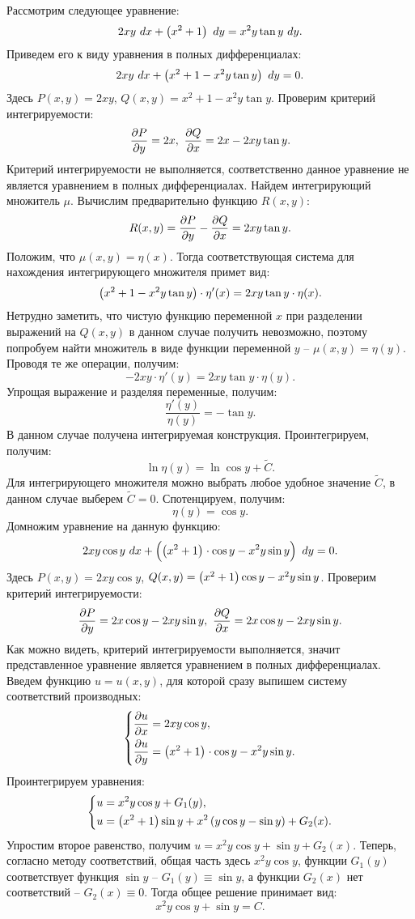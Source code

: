 		Рассмотрим следующее уравнение:
		\[ 2xy ~ dx + \left( x^2 + 1 \right) ~ dy = x^2 y \tan{y} ~ dy. \]
		Приведем его к виду уравнения в полных дифференциалах:
		\[ 2xy ~ dx + \left( x^2 + 1 - x^2 y \tan{y} \right) ~ dy = 0. \]
		Здесь $P(x, y) = 2xy$, $Q(x, y) = x^2 + 1 - x^2 y \tan{y}$. Проверим критерий интегрируемости:
		\[ \dfrac{\partial P}{\partial y} = 2x, ~ \dfrac{\partial Q}{\partial x} = 2x - 2xy \tan{y}. \]
		Критерий интегрируемости не выполняется, соответственно данное уравнение не является уравнением в полных дифференциалах. Найдем интегрирующий множитель $\mu$. Вычислим предварительно функцию $R(x, y)$: 
		\[ R(x, y) = \dfrac{\partial P}{\partial y} - \dfrac{\partial Q}{\partial x} = 2xy \tan{y}. \]
		Положим, что $\mu(x, y) = \eta(x)$. Тогда соответствующая система для нахождения интегрирующего множителя примет вид:
		\[ \left( x^2 + 1 - x^2 y \tan{y} \right) \cdot \eta'(x) = 2xy \tan{y} \cdot \eta(x). \]
		Нетрудно заметить, что чистую функцию переменной $x$ при разделении выражений на $Q(x, y)$ в данном случае получить невозможно, поэтому попробуем найти множитель в виде функции переменной $y$ -- $\mu(x, y) = \eta(y)$. Проводя те же операции, получим:
		\[ -2xy \cdot \eta'(y) = 2xy \tan{y} \cdot \eta(y). \]
		Упрощая выражение и разделяя переменные, получим:
		\[ \frac{\eta'(y)}{\eta(y)} = -\tan{y}. \]
		В данном случае получена интегрируемая конструкция. Проинтегрируем, получим:
		\[ \ln{\eta(y)} = \ln{\cos{y}} + \tilde{C}. \]
		Для интегрирующего множителя можно выбрать любое удобное значение $\tilde{C}$, в данном случае выберем $\tilde{C} = 0$. Спотенцируем, получим:
		\[ \eta(y) = \cos{y}. \]
		Домножим уравнение на данную функцию:
		\[ 2xy \cos{y} ~ dx + \left( \left( x^2 + 1 \right)^{\vphantom{2}} \cdot \cos{y} - x^2 y \sin{y} \right) ~ dy = 0. \]
		Здесь $P(x, y) = 2xy \cos{y}$, $Q(x, y) = \left( x^2 + 1 \right) \cos{y} - x^2 y \sin{y}$. Проверим критерий интегрируемости:
		\[ \dfrac{\partial P}{\partial y} = 2x \cos{y} - 2xy \sin{y}, ~ \dfrac{\partial Q}{\partial x} = 2x \cos{y} - 2xy \sin{y}. \]
		Как можно видеть, критерий интегрируемости выполняется, значит представленное уравнение является уравнением в полных дифференциалах. Введем функцию $u = u(x, y)$, для которой сразу выпишем систему соответствий производных:
		\[ \left\lbrace \begin{split} \dfrac{\partial u}{\partial x} &= 2xy \cos{y}, \\ \dfrac{\partial u}{\partial y} &= \left( x^2 + 1 \right)^{\vphantom{2}} \cdot \cos{y} - x^2 y \sin{y}. \end{split} \right. \]
		Проинтегрируем уравнения:
		\[ \left\lbrace \begin{split} 
			u &= x^2 y \cos{y} + G_1(y), \\
			u &= \left( x^2 + 1 \right) \sin{y} + x^2 \left( y \cos{y} - \sin{y} \right) + G_2(x). 
		\end{split} \right.\]
		Упростим второе равенство, получим $u = x^2 y \cos{y} + \sin{y} + G_2(x)$. Теперь, согласно методу соответствий, общая часть здесь $x^2 y \cos{y}$, функции $G_1(y)$ соответствует функция $\sin{y}$ -- $G_1(y) \equiv \sin{y}$, а функции $G_2(x)$ нет соответствий -- $G_2(x) \equiv 0$. Тогда общее решение принимает вид:
		\[ x^2 y \cos{y} + \sin{y} = C. \]

	\pagebreak